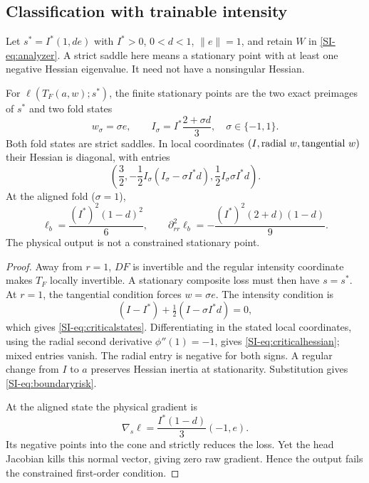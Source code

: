 \subsection{Classification with trainable intensity}
Let $s^*=I^*(1,de)$ with $I^*>0$, $0<d<1$, $\|e\|=1$, and retain $W$ in \eqref{SI-eq:analyzer}. A strict saddle here means a stationary point with at least one negative Hessian eigenvalue. It need not have a nonsingular Hessian.

\begin{theorem}
\label{SI-thm:classification}
For $\ell(T_F(a,w);s^*)$, the finite stationary points are the two exact preimages of $s^*$ and two fold states
\begin{equation}
 w_\sigma=\sigma e,\qquad I_\sigma=I^*\frac{2+\sigma d}{3},
 \quad\sigma\in\{-1,1\}.
 \label{SI-eq:criticalstates}
\end{equation}
Both fold states are strict saddles. In local coordinates $(I,\hbox{radial }w,\hbox{tangential }w)$ their Hessian is diagonal, with entries
\begin{equation}
 \left(\frac32,
 -\frac12 I_\sigma(I_\sigma-\sigma I^*d),
 \frac12 I_\sigma\sigma I^*d\right).
 \label{SI-eq:criticalhessian}
\end{equation}
At the aligned fold ($\sigma=1$),
\begin{equation}
 \ell_b=\frac{(I^*)^2(1-d)^2}{6},\qquad
 \partial_{rr}^2\ell_b=-\frac{(I^*)^2(2+d)(1-d)}9.
 \label{SI-eq:boundaryrisk}
\end{equation}
The physical output is not a constrained stationary point.
\end{theorem}
\begin{proof}
Away from $r=1$, $DF$ is invertible and the regular intensity coordinate makes $T_F$ locally invertible. A stationary composite loss must then have $s=s^*$. At $r=1$, the tangential condition forces $w=\sigma e$. The intensity condition is
\begin{equation*}
 (I-I^*)+\tfrac12(I-\sigma I^*d)=0,
\end{equation*}
which gives \eqref{SI-eq:criticalstates}. Differentiating in the stated local coordinates, using the radial second derivative $\phi''(1)=-1$, gives \eqref{SI-eq:criticalhessian}; mixed entries vanish. The radial entry is negative for both signs. A regular change from $I$ to $a$ preserves Hessian inertia at stationarity. Substitution gives \eqref{SI-eq:boundaryrisk}.

At the aligned state the physical gradient is
\begin{equation*}
 \nabla_s\ell=\frac{I^*(1-d)}3(-1,e).
\end{equation*}
Its negative points into the cone and strictly reduces the loss. Yet the head Jacobian kills this normal vector, giving zero raw gradient. Hence the output fails the constrained first-order condition.
\end{proof}
